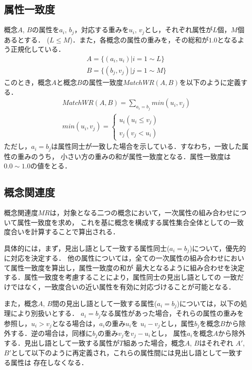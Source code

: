 \documentclass[japanese]{jnlp_1.3e}
\begin{document}
\subsection{属性一致度}

概念$A$, $B$の属性を$a_i$, $b_j$，対応する重みを$u_i$, $v_j$とし，それぞれ属性が$L$個，$M$個あるとする．
($L\leq M$)．また，各概念の属性の重みを，その総和が$1.0$となるよう正規化している．
\begin{gather*}
A=\{(a_i,u_i)|i=1\sim L\} \\
B=\{(b_j,v_j)|j=1\sim M\}
\end{gather*}
このとき，概念$A$と概念$B$の属性一致度$\mathit{MatchWR}(A,B)$を以下のように定義する．
\begin{gather}
 \mathit{MatchWR}(A,B)=\sum_{a_i=b_j}\mathit{min}(u_i,v_j)\\
 \mathit{min}(u_i,v_j)=
  \begin{cases}
	u_i(u_i\leq v_j)\\
	v_j(v_j<u_i)
  \end{cases}
\end{gather} 
ただし，$a_i=b_j$は属性同士が一致した場合を示している．すなわち，一致した属性の重みのうち，
小さい方の重みの和が属性一致度となる．属性一致度は$0.0\sim 1.0$の値をとる．

\subsection{概念関連度}

概念関連度$\mathit{MR}$は，対象となる二つの概念において，一次属性の組み合わせについて属性一致度を求め，
これを基に概念を構成する属性集合全体としての一致度合いを計算することで算出される．

具体的には，まず，見出し語として一致する属性同士($a_i=b_j$)について，優先的に対応を決定する．
他の属性については，全ての一次属性の組み合わせにおいて属性一致度を算出し，属性一致度の和が
最大となるように組み合わせを決定する．属性一致度を考慮することにより，属性同士の見出し語としての
一致だけではなく，一致度合いの近い属性を有効に対応づけることが可能となる．

また，概念$A$, $B$間の見出し語として一致する属性($a_i=b_j$)については，以下の処理により別扱いとする．
$a_i=b_j$なる属性があった場合，それらの属性の重みを参照し，$u_i>v_j$となる場合は，$a_i$の重み$u_i$を
$u_i-v_j$とし，属性$b_j$を概念$B$から除外する．逆の場合は，同様に$b_j$の重み$v_j$を$v_j-u_i$とし，
属性$a_i$を概念$A$から除外する．見出し語として一致する属性が$T$組あった場合，概念$A$, $B$はそれぞれ
$A' $, $B' $として以下のように再定義され，これらの属性間には見出し語として一致する属性は
存在しなくなる．
\end{document}

